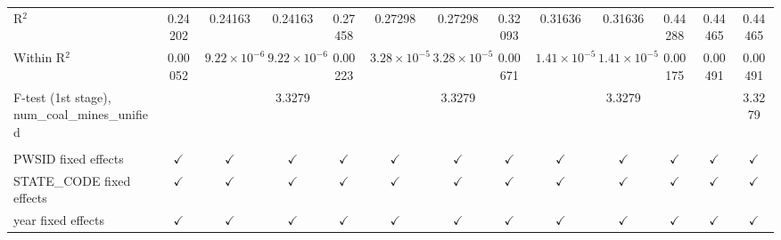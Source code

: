 \begin{table}[htbp]
\begin{adjustbox}{width = \textwidth, center}
\begin{tabular}{lcccccccccccc}
         R$^2$                                            & 0.24202       & 0.24163               & 0.24163               & 0.27458         & 0.27298               & 0.27298               & 0.32093         & 0.31636               & 0.31636               & 0.44288       & 0.44465        & 0.44465\\  
         Within R$^2$                                     & 0.00052       & $9.22\times 10^{-6}$  & $9.22\times 10^{-6}$  & 0.00223         & $3.28\times 10^{-5}$  & $3.28\times 10^{-5}$  & 0.00671         & $1.41\times 10^{-5}$  & $1.41\times 10^{-5}$  & 0.00175       & 0.00491        & 0.00491\\  
         F-test (1st stage), num\_coal\_mines\_unified    &               &                       & 3.3279                &                 &                       & 3.3279                &                 &                       & 3.3279                &               &                & 3.3279\\  
          \\
         PWSID fixed effects                              & $\checkmark$  & $\checkmark$          & $\checkmark$          & $\checkmark$    & $\checkmark$          & $\checkmark$          & $\checkmark$    & $\checkmark$          & $\checkmark$          & $\checkmark$  & $\checkmark$   & $\checkmark$\\   
         STATE\_CODE fixed effects                        & $\checkmark$  & $\checkmark$          & $\checkmark$          & $\checkmark$    & $\checkmark$          & $\checkmark$          & $\checkmark$    & $\checkmark$          & $\checkmark$          & $\checkmark$  & $\checkmark$   & $\checkmark$\\   
         year fixed effects                               & $\checkmark$  & $\checkmark$          & $\checkmark$          & $\checkmark$    & $\checkmark$          & $\checkmark$          & $\checkmark$    & $\checkmark$          & $\checkmark$          & $\checkmark$  & $\checkmark$   & $\checkmark$\\   
         \bottomrule
      \end{tabular}
   \end{adjustbox}
\end{table}


